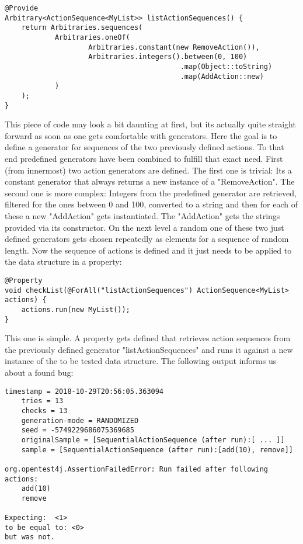 \documentclass[a4paper, 12pt]{article} %
\begin{document}
\begin{verbatim}
@Provide
Arbitrary<ActionSequence<MyList>> listActionSequences() {
    return Arbitraries.sequences(
            Arbitraries.oneOf(
                    Arbitraries.constant(new RemoveAction()),
                    Arbitraries.integers().between(0, 100)
                                          .map(Object::toString)
                                          .map(AddAction::new)
            )
    );
}
\end{verbatim} 

This piece of code may look a bit daunting at first, but its actually quite straight forward as soon as one gets comfortable with generators. Here the goal is to define a generator for sequences of the two previously defined actions. To that end predefined generators have been combined to fulfill that exact need. First (from innermost) two action generators are defined. The first one is trivial: Its a constant generator that always returns a new instance of a "RemoveAction". The second one is more complex: Integers from the predefined generator are retrieved, filtered for the ones between 0 and 100, converted to a string and then for each of these a new "AddAction" gets instantiated. The "AddAction" gets the strings provided via its constructor. On the next level a random one of these two just defined generators gets chosen repeatedly as elements for a sequence of random length. Now the sequence of actions is defined and it just needs to be applied to the data structure in a property:

\begin{verbatim}
@Property
void checkList(@ForAll("listActionSequences") ActionSequence<MyList> actions) {
    actions.run(new MyList());
}
\end{verbatim} 

This one is simple. A property gets defined that retrieves action sequences from the previously defined generator "listActionSequences" and runs it against a new instance of the to be tested data structure. The following output informs us about a found bug:

\begin{verbatim}
timestamp = 2018-10-29T20:56:05.363094
    tries = 13
    checks = 13
    generation-mode = RANDOMIZED
    seed = -5749229686075369685
    originalSample = [SequentialActionSequence (after run):[ ... ]]
    sample = [SequentialActionSequence (after run):[add(10), remove]]

org.opentest4j.AssertionFailedError: Run failed after following actions:
    add(10)
    remove

Expecting:  <1>
to be equal to: <0>
but was not.
\end{verbatim}
\end{document}
